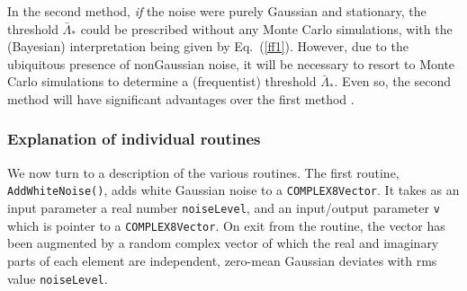 \documentclass{article}
\begin{document}
In the second method, {\it if} the noise were purely Gaussian and
stationary, the threshold ${\bar \Lambda}_*$ could be prescribed 
without any Monte Carlo simulations, with the (Bayesian)
interpretation being given by Eq.\ (\ref{ff1}).  However, due to the
ubiquitous presence of nonGaussian noise, it will be necessary to
resort to Monte Carlo simulations to determine a (frequentist)
threshold ${\bar \Lambda}_*$.  Even so, the second method will have
significant advantages over the first method \cite{abcf:2000}. 
 

\subsubsection{Explanation of individual routines}
\label{individual}

We now turn to a description of the various routines.  The first
routine, \verb+AddWhiteNoise()+, adds white Gaussian noise to a
\verb+COMPLEX8Vector+.  It takes as an 
input parameter a real number \verb+noiseLevel+, and an input/output
parameter \verb+v+ which is pointer to a \verb+COMPLEX8Vector+.  On
exit from the routine, the vector has been augmented by a random
complex vector of which the real and imaginary parts of each element
are independent, zero-mean Gaussian deviates with rms value
\verb+noiseLevel+.
\end{document}
